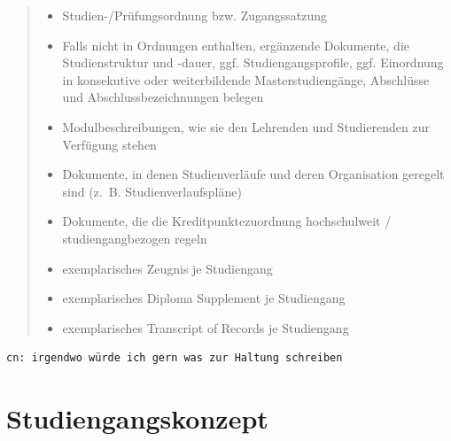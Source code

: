 \begin{quote}
\begin{itemize}
\item
  Studien-/Prüfungsordnung bzw. Zugangssatzung
\item
  Falls nicht in Ordnungen enthalten, ergänzende Dokumente, die
  Studienstruktur und -dauer, ggf. Studiengangsprofile, ggf. Einordnung
  in konsekutive oder weiterbildende Masterstudiengänge, Abschlüsse und
  Abschlussbezeichnungen belegen
\item
  Modulbeschreibungen, wie sie den Lehrenden und Studierenden zur
  Verfügung stehen
\item
  Dokumente, in denen Studienverläufe und deren Organisation geregelt
  sind (z.~B. Studienverlaufspläne)
\item
  Dokumente, die die Kreditpunktezuordnung hochschulweit /
  studiengangbezogen regeln
\item
  exemplarisches Zeugnis je Studiengang
\item
  exemplarisches Diploma Supplement je Studiengang
\item
  exemplarisches Transcript of Records je Studiengang
\end{itemize}
\end{quote}

\begin{verbatim}
cn: irgendwo würde ich gern was zur Haltung schreiben
\end{verbatim}

\chapter{Studiengangskonzept}\label{studiengangskonzept}

